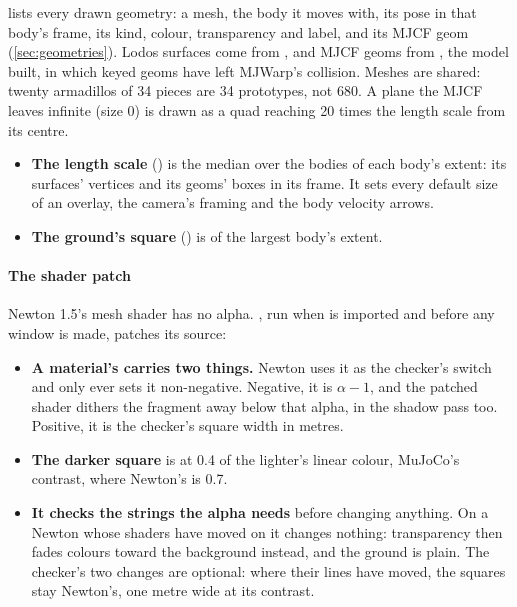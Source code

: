  lists every drawn geometry: a mesh, the body it moves with, its pose in that body's frame, its kind, colour, transparency and label, and its MJCF geom (\cref{sec:geometries}). Lodos surfaces come from , and MJCF geoms from , the model  built, in which keyed geoms have left MJWarp's collision. Meshes are shared: twenty armadillos of 34 pieces are 34 prototypes, not 680. A plane the MJCF leaves infinite (size 0) is drawn as a quad reaching 20 times the length scale from its centre.

\begin{itemize}
\item \textbf{The length scale} () is the median over the bodies of each body's extent: its surfaces' vertices and its geoms' boxes in its frame. It sets every default size of an overlay, the camera's framing and the body velocity arrows.
\item \textbf{The ground's square} () is  of the largest body's extent.
\end{itemize}

\paragraph{The shader patch} Newton 1.5's mesh shader has no alpha. , run when  is imported and before any window is made, patches its source:

\begin{itemize}
\item \textbf{A material's  carries two things.} Newton uses it as the checker's switch and only ever sets it non-negative. Negative, it is $\alpha - 1$, and the patched shader dithers the fragment away below that alpha, in the shadow pass too. Positive, it is the checker's square width in metres.
\item \textbf{The darker square} is at 0.4 of the lighter's linear colour, MuJoCo's contrast, where Newton's is 0.7.
\item \textbf{It checks the strings the alpha needs} before changing anything. On a Newton whose shaders have moved on it changes nothing: transparency then fades colours toward the background instead, and the ground is plain. The checker's two changes are optional: where their lines have moved, the squares stay Newton's, one metre wide at its contrast.
\end{itemize}

